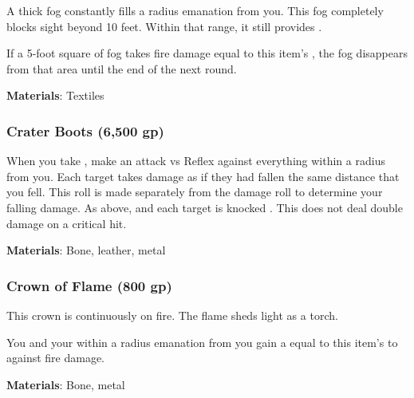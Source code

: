 A thick fog constantly fills a \areamed radius emanation from you.
This fog completely blocks sight beyond 10 feet.
Within that range, it still provides \concealment.

If a 5-foot square of fog takes fire damage equal to this item's , the fog disappears from that area until the end of the next round.



\vspace{0.25em}
\textbf{Materials}: Textiles


\lowercase{\hypertarget{item:Crater Boots}{}}\label{item:Crater Boots}
\hypertarget{item:Crater Boots}{\subsubsection{Crater Boots\hfill{} (6,500 gp)}}

When you take , make an attack vs Reflex against everything within a \areasmall radius from you.
\hit Each target takes damage as if they had fallen the same distance that you fell.
This roll is made separately from the damage roll to determine your falling damage.
\crit As above, and each target is knocked .
This does not deal double damage on a critical hit.



\vspace{0.25em}
\textbf{Materials}: Bone, leather, metal


\lowercase{\hypertarget{item:Crown of Flame}{}}\label{item:Crown of Flame}
\hypertarget{item:Crown of Flame}{\subsubsection{Crown of Flame\hfill{} (800 gp)}}

This crown is continuously on fire.
The flame sheds light as a torch.

You and your  within a \arealarge radius emanation from you
gain a  equal to this item's  to  against fire damage.



\vspace{0.25em}
\textbf{Materials}: Bone, metal


